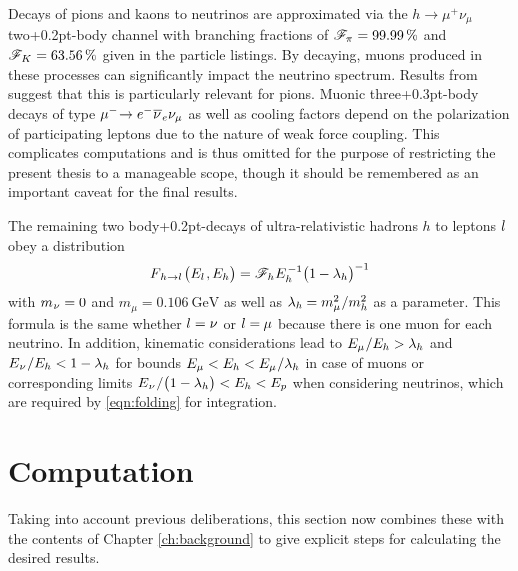Decays of pions and kaons to neutrinos are approximated via the $h \rightarrow \mu^+ \nu_\mu$ two{\kern+0.2pt}-body channel
with branching fractions of $\mathscr{F}_{\kern-0.2pt \pi \kern+0.2pt} = \qty{99.99}{\percent}$ and
$\mathscr{F}_{\kern+0.3pt K \kern+0.2pt} = \qty{63.56}{\percent}$ given in the \cite{pdg}
particle listings. By decaying, muons produced in these processes can significantly impact the neutrino spectrum. Results from
\cite{Carpio_2020} suggest that this is particularly relevant for pions. Muonic three{\kern+0.3pt}-body decays of type
$\mu^- \kern-2.5pt \kern+0.5pt \rightarrow e^- \kern+0.5pt \overline{\kern-0.2pt \nu \kern+0.8pt}_e \nu_\mu$ as well as
cooling factors depend on the polarization of participating leptons due to the nature of weak force coupling. This complicates
computations and is thus omitted for the purpose of restricting the present thesis to a manageable scope, though it should be
remembered as an important caveat for the final results.

The remaining two body{\kern+0.2pt}-decays of ultra-relativistic hadrons $h$ to leptons $l \kern+1.0pt$ obey a distribution
\begin{equation*}
	F_{\kern+1.0pt h \kern+0.2pt \rightarrow l \kern+1.0pt} \bigl( E_l \kern+0.8pt, \kern-0.2pt E_h \bigr) =
	\mathscr{F}_{\kern+0.2pt h \kern+0.2pt} E_h^{\kern+1.0pt -1} \bigl( 1 \kern-0.3pt - \lambda_h \bigr)^{-1}
\end{equation*}
with $m_{\kern+0.5pt \nu} = 0$ and $m_\mu = \qty{0.106}{\giga\electronvolt}$ \cite{pdg} as well as
$\lambda_h \kern-0.3pt = m_\mu^2 \kern+0.5pt / m_h^2$ as a parameter. This formula is the same whether
$l = \nu \kern+0.2pt$ or $l = \kern-0.3pt \mu$ because there is one muon for each neutrino. In addition,
kinematic considerations lead to $E_\mu \kern+0.5pt / E_h > \lambda_h$ and
$E_{\kern+0.5pt \nu} \kern+0.5pt / E_h < 1 - \lambda_h$ for bounds
$E_\mu < E_h < E_\mu \kern+0.5pt / \lambda_h$ in case of muons or corresponding limits
$E_{\kern+0.5pt \nu} \kern+0.5pt / \smash{\bigl( 1 - \lambda_h \bigr)} < E_h < E_p$ when considering neutrinos, which are
required by \eqref{eqn:folding} for integration.



\section{Computation}
\label{sec:computation}

Taking into account previous deliberations, this section now combines these with the contents of Chapter \ref{ch:background}
to give explicit steps for calculating the desired results.



